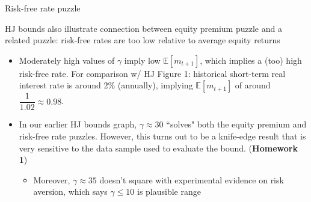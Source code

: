 \documentclass[xcolor=table, aspectratio=169]{beamer}
\newcommand{\E}{\mathbb{E}}
\newcommand{\alertbf}[1]{\alert{\textbf{#1}}}
\begin{document}
\begin{frame}{Risk-free rate puzzle}

HJ bounds also illustrate connection between equity premium puzzle and a related puzzle: risk-free rates are too low relative to average equity returns

\begin{itemize}
\item Moderately high values of $\gamma$ imply low $\E[m_{t+1}]$, which implies a (too) high risk-free rate. For comparison w/ HJ Figure 1: historical short-term real interest rate is around 2\% (annually), implying $\E[m_{t+1}]$ of around $\dfrac{1}{1.02} \approx 0.98$.

\item In our earlier HJ bounds graph, $\gamma \approx 30$ ``solves" both the equity premium and risk-free rate puzzles. However, this turns out to be a knife-edge result that is very sensitive to the data sample used to evaluate the bound. (\alertbf{Homework 1})
\begin{itemize}
\item Moreover, $\gamma \approx 35$ doesn't square with experimental evidence on risk aversion, which says $\gamma \leq 10$ is plausible range
\end{itemize}

\end{itemize}

\end{frame}

\begin{comment}
\begin{frame}{Risk-free rate puzzle}
\begin{itemize}
\item It is a ``knife-edge" case, because one has to balance two countervailing economic effects on the risk-free rate with changing $\gamma$: 
\end{itemize}
\begin{enumerate}
\item First, ignoring convexity, higher $\gamma$ implies lower expected marginal utility growth. This lowers the incentive for the representative agent to save and increases the risk-free rate. 

\item Second, marginal utility is convex in $\frac{C_{t+1}}{C_t}$. With uncertainty about $\frac{C_{t+1}}{C_t}$, higher $\gamma$ implies more convexity, and hence higher expected marginal utility growth 
\begin{itemize}
\item Generates a precautionary saving motive for the representative agent to reduce volatility of future marginal utility and reduce expected marginal utility growth. For high values of $\gamma$, this effect dominates, and higher $\gamma$ raises demand for the riskless asset, causing the risk-free rate to decline in equilibrium with higher $\gamma$
\end{itemize}
\end{enumerate}
\end{frame}
\end{comment}
\end{document}
